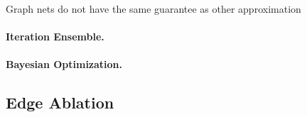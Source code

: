 Graph nets do not have the same guarantee as other approximation

\paragraph{Iteration Ensemble.}

\paragraph{Bayesian Optimization.}

\subsection{Edge Ablation}


